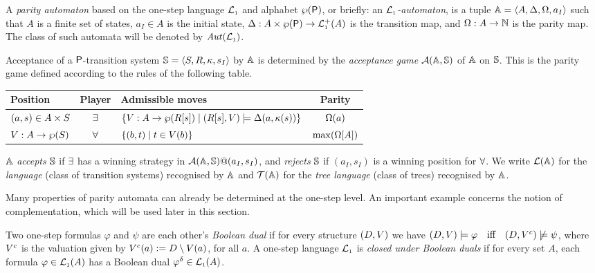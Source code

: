 \begin{definition} \label{def:partityaut}
A \emph{parity automaton} based on the one-step language $\mathcal{L}_{\scriptscriptstyle 1}$ and alphabet
$\wp(\mathsf{P})$, or briefly: an \emph{$\mathcal{L}_{\scriptscriptstyle 1}$-automaton}, is a tuple $\mathbb{A} = 
\langle{A,\Delta,\Omega,a_I}\rangle$ such that $A$ is a finite set of states, $a_I \in A$ is
the initial state, $\Delta: A\times \wp(\mathsf{P}) \to \mathcal{L}_{\scriptscriptstyle 1}^+(A)$
is the transition map, and $\Omega: A \to \mathbb{N}$ is the parity map.
The class of such automata will be denoted by $\mathit{Aut}(\mathcal{L}_{\scriptscriptstyle 1})$.

Acceptance of a $\mathsf{P}$-transition system $\mathbb{S} = 
\langle{S,R,\kappa,s_I}\rangle$ by $\mathbb{A}$ is determined by the \emph{acceptance 
game} $\mathcal{A}(\mathbb{A},\mathbb{S})$ of $\mathbb{A}$ on $\mathbb{S}$. 
This is the parity game defined according to the rules of the following table.
\begin{center}
\small
\begin{tabular}{|l|c|l|c|} \hline
Position & Player & Admissible moves & Parity \\
\hline
    $(a,s) \in A \times S$
  & $\exists$
  & $\{V : A \to \wp(R[s]) \mid (R[s],V) \models \Delta (a, \kappa(s)) \}$
  & $\Omega(a)$ 
\\
    $V : A \rightarrow \wp(S)$
  & $\forall$
  & $\{(b,t) \mid t \in V(b)\}$
  & $\max(\Omega[A])$
\\ \hline
 \end{tabular}
\end{center}
%
$\mathbb{A}$ \emph{accepts} $\mathbb{S}$ if $\exists$ has a winning strategy in 
$\mathcal{A}(\mathbb{A},\mathbb{S})@(a_I,s_I)$, and \emph{rejects} $\mathbb{S}$ if $(a_I,s_I)$ is 
a winning position for $\forall$. 
We write $\mathcal{L}(\mathbb{A})$ for the \emph{language} (class of transition systems) 
recognised by $\mathbb{A}$ and $\mathcal{T}(\mathbb{A})$ for the \emph{tree language} (class of 
trees) recognised by $\mathbb{A}$.
\end{definition}

Many properties of parity automata can already be determined at the one-step
level.
An important example concerns the notion of complementation, which will be used
later in this section.

\begin{definition}
\label{d:bdual1}
Two one-step formulas $\varphi$ and $\psi$ are each other's \emph{Boolean dual}
if for every structure $(D,V)$ we have $(D,\val) \models \varphi\quad
\text{iff}\quad (D,\val^{c}) \not\models \psi$, where $V^{c}$ is the 
valuation given by $V^{c}(a) \mathrel{:=} D \setminus V(a)$, for all $a$.
%
A one-step language $\mathcal{L}_{\scriptscriptstyle 1}$ is \emph{closed under Boolean duals} if for every
set $A$, each formula $\varphi \in \mathcal{L}_{\scriptscriptstyle 1}(A)$ has a Boolean dual $\varphi^{\delta}
\in \mathcal{L}_{\scriptscriptstyle 1}(A)$.
\end{definition}

